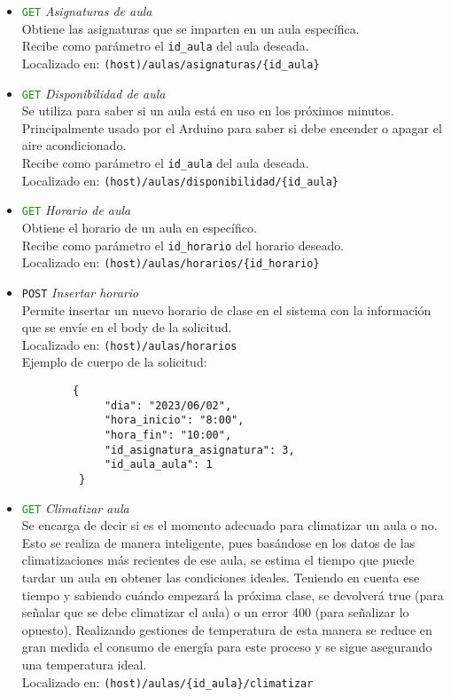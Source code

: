 \documentclass[12pt]{report}
\begin{document}
\begin{itemize}
\begin{itemize}
    \item \textcolor{ForestGreen}{\texttt{GET}} \textit{Asignaturas de aula}\\
    Obtiene las asignaturas que se imparten en un aula específica.\\
    Recibe como parámetro el \texttt{id\_aula} del aula deseada.\\
    Localizado en: \texttt{(host)/aulas/asignaturas/\{id\_aula\}}
    
    \item \textcolor{ForestGreen}{\texttt{GET}} \textit{Disponibilidad de aula}\\
    Se utiliza para saber si un aula está en uso en los próximos minutos. Principalmente usado por el Arduino para saber si debe encender o apagar el aire acondicionado.\\
    Recibe como parámetro el \texttt{id\_aula} del aula deseada.\\
    Localizado en: \texttt{(host)/aulas/disponibilidad/\{id\_aula\}}
    
    \item \textcolor{ForestGreen}{\texttt{GET}} \textit{Horario de aula}\\
    Obtiene el horario de un aula en específico.\\
    Recibe como parámetro el \texttt{id\_horario} del horario deseado.\\
    Localizado en: \texttt{(host)/aulas/horarios/\{id\_horario\}}
    
    \item \textcolor{YellowOrange}{\texttt{POST}} \textit{Insertar horario}\\
    Permite insertar un nuevo horario de clase en el sistema con la información que se envíe en el body de la solicitud.\\
    Localizado en: \texttt{(host)/aulas/horarios}
            \\Ejemplo de cuerpo de la solicitud:
        \begin{verbatim}
        {
             "dia": "2023/06/02",
             "hora_inicio": "8:00",
             "hora_fin": "10:00",
             "id_asignatura_asignatura": 3,
             "id_aula_aula": 1
         }
        \end{verbatim}
        
    \item \textcolor{ForestGreen}{\texttt{GET}} \textit{Climatizar aula}\\
    Se encarga de decir si es el momento adecuado para climatizar un aula o no. Esto se realiza de manera inteligente, pues basándose en los datos de las climatizaciones más recientes de ese aula, se estima el tiempo que puede tardar un aula en obtener las condiciones ideales. Teniendo en cuenta ese tiempo y sabiendo cuándo empezará la próxima clase, se devolverá true (para señalar que se debe climatizar el aula) o un error 400 (para señalizar lo opuesto). Realizando gestiones de temperatura de esta manera se reduce en gran medida el consumo de energía para este proceso y se sigue asegurando una temperatura ideal.\\
    Localizado en: \texttt{(host)/aulas/\{id\_aula\}/climatizar}


\end{itemize}
\end{itemize}
\end{document}
